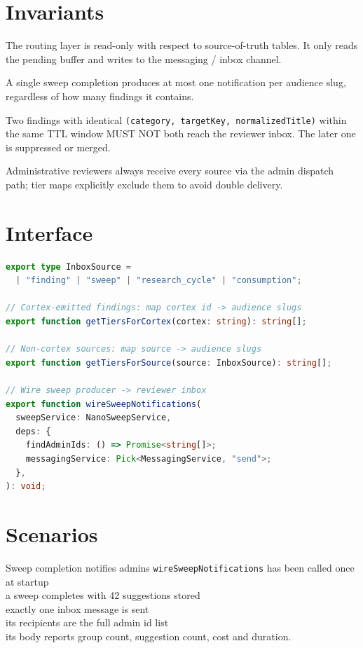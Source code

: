 \section{Invariants}
\begin{invariant}
The routing layer is read-only with respect to source-of-truth tables. It only reads the pending buffer and writes to the messaging / inbox channel.
\end{invariant}
\begin{invariant}
A single sweep completion produces at most one notification per audience slug, regardless of how many findings it contains.
\end{invariant}
\begin{invariant}
Two findings with identical \texttt{(category, targetKey, normalizedTitle)} within the same TTL window MUST NOT both reach the reviewer inbox. The later one is suppressed or merged.
\end{invariant}
\begin{invariant}
Administrative reviewers always receive every source via the admin dispatch path; tier maps explicitly exclude them to avoid double delivery.
\end{invariant}

\section{Interface}

\begin{lstlisting}[language=TypeScript]
export type InboxSource =
  | "finding" | "sweep" | "research_cycle" | "consumption";

// Cortex-emitted findings: map cortex id -> audience slugs
export function getTiersForCortex(cortex: string): string[];

// Non-cortex sources: map source -> audience slugs
export function getTiersForSource(source: InboxSource): string[];

// Wire sweep producer -> reviewer inbox
export function wireSweepNotifications(
  sweepService: NanoSweepService,
  deps: {
    findAdminIds: () => Promise<string[]>;
    messagingService: Pick<MessagingService, "send">;
  },
): void;
\end{lstlisting}

\section{Scenarios}

\begin{scenario}{Sweep completion notifies admins}
\Given \texttt{wireSweepNotifications} has been called once at startup \\
\When a sweep completes with 42 suggestions stored \\
\Then exactly one inbox message is sent \\
\And its recipients are the full admin id list \\
\And its body reports group count, suggestion count, cost and duration.
\end{scenario}

